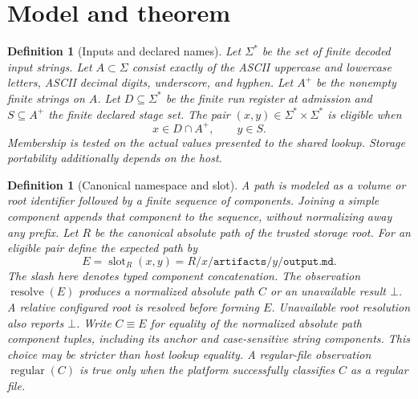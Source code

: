 \documentclass[12pt]{article}
\newtheorem{definition}[theorem]{Definition}
\newcommand{\denied}{\bot}
\newcommand{\regular}{\operatorname{regular}}
\newcommand{\slot}{\operatorname{slot}}
\newcommand{\resolve}{\operatorname{resolve}}
\begin{document}
\section{Model and theorem}

\begin{definition}[Inputs and declared names]
\label{def:inputs}
Let $\Sigma^*$ be the set of finite decoded input strings.
Let $A\subset\Sigma$ consist exactly of the ASCII uppercase and
lowercase letters, ASCII decimal digits, underscore, and hyphen.
Let $A^+$ be the nonempty finite strings on $A$.
Let $D\subseteq\Sigma^*$ be the finite run register at admission
and $S\subseteq A^+$ the finite declared stage set.
The pair $(x,y)\in\Sigma^*\times\Sigma^*$ is eligible when
\begin{equation}
\label{eq:eligible}
x\in D\cap A^+,\qquad y\in S.
\end{equation}
Membership is tested on the actual values presented to the shared
lookup. Storage portability additionally depends on the host.
\end{definition}

\begin{definition}[Canonical namespace and slot]
\label{def:namespace}
A path is modeled as a volume or root identifier followed by a
finite sequence of components. Joining a simple component appends
that component to the sequence, without normalizing away any prefix.
Let $R$ be the canonical absolute path of the trusted storage root.
For an eligible pair define the expected path by
\begin{equation}
\label{eq:slot}
E=\slot_R(x,y)=R/x/\texttt{artifacts}/y/\texttt{output.md}.
\end{equation}
The slash here denotes typed component concatenation. The observation
$\resolve(E)$ produces a normalized absolute path $C$ or an unavailable
result $\denied$. A relative configured root is resolved before forming
$E$. Unavailable root resolution also reports $\denied$.
Write $C\equiv E$ for equality of the normalized absolute path component tuples,
including its anchor and case-sensitive string components.
This choice may be stricter than host lookup equality. A regular-file
observation $\regular(C)$ is true only when the platform successfully
classifies $C$ as a regular file.
\end{definition}
\end{document}
